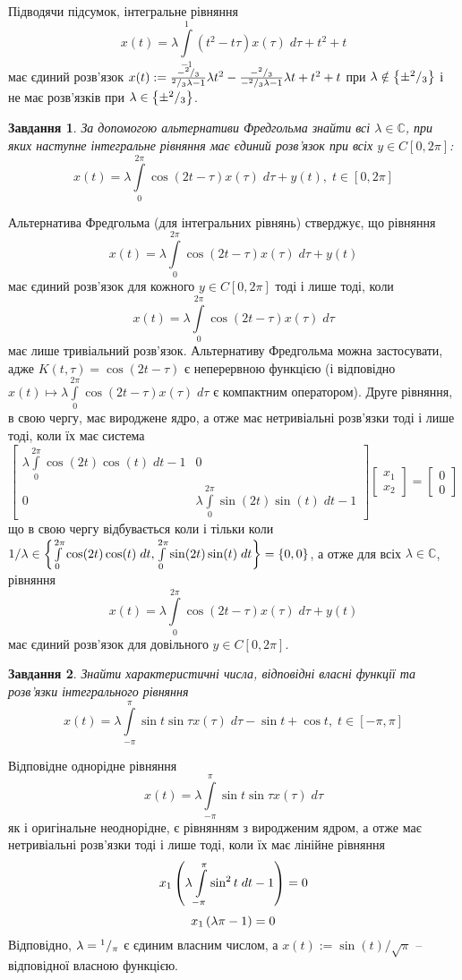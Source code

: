 \documentclass[12pt]{article} %
\newtheorem{prob}{Завдання}
\newcommand{\dt}{\;dt}
\let\oldint\int
\renewcommand{\int}{\oldint\limits}
\begin{document}
		Підводячи підсумок, інтегральне рівняння
		\[x(t)=\lambda\int_{-1}^1(t^2-t\tau)x(\tau)\;d\tau+t^2+t\]
		має єдиний розв’язок $x(t):=\frac{-{^{2}/_{3}}}{{^{2}/_{3}}\lambda-1}\lambda t^2-\frac{-{^{2}/_{3}}}{-{^{2}/_{3}}\lambda-1}
		\lambda t+t^2+t$ при $\lambda\notin\left\{\pm{^{2}/_{3}}\right\}$ і не має розв’язків при $\lambda\in\left\{\pm{^{2}/_{3}}\right\}$.
\begin{prob}За допомогою альтернативи Фредгольма знайти всі $\lambda\in\mathbb{C}$, при яких наступне інтегральне рівняння
	має єдиний розв’язок при всіх $y\in C[0,2\pi]$:
	\[x(t)=\lambda\int_0^{2\pi}\cos(2t-\tau)x(\tau)\;d\tau+y(t),\;t\in[0,2\pi]\]
\end{prob}
Альтернатива Фредгольма (для інтегральних рівнянь) стверджує, що рівняння 
\[x(t)=\lambda\int_0^{2\pi}\cos(2t-\tau)x(\tau)\;d\tau+y(t)\]
має єдиний розв’язок для кожного $y\in C[0,2\pi]$ тоді і лише тоді, коли
\[x(t)=\lambda\int_0^{2\pi}\cos(2t-\tau)x(\tau)\;d\tau\]
має лише тривіальний розв’язок. Альтернативу Фредгольма можна застосувати, адже $K(t,\tau)=\cos(2t-\tau)$ є неперервною функцією 
(і відповідно $x(t)\mapsto\lambda\int_0^{2\pi}\cos(2t-\tau)x(\tau)\;d\tau$ є компактним оператором). Друге рівняння, в свою чергу, має вироджене
ядро, а отже має нетривіальні розв’язки тоді і лише тоді, коли їх має система
\[\begin{bmatrix}\lambda\int_0^{2\pi}\cos(2t)\cos(t)\;dt-1&0\\0&\lambda\int_0^{2\pi}\sin(2t)\sin(t)\;dt-1\end{bmatrix}
	\begin{bmatrix}x_1\\x_2\end{bmatrix}=\begin{bmatrix}0\\0\end{bmatrix}\]
		що в свою чергу відбувається коли і тільки коли $1/\lambda\in\mycbra{{\int_0^{2\pi}\cos(2t)\cos(t)\;dt},
		{\int_0^{2\pi}\sin(2t)\sin(t)\;dt}}=\mycbra{0,0}$, а отже для всіх $\lambda\in\mathbb{C}$, рівняння
		\[x(t)=\lambda\int_0^{2\pi}\cos(2t-\tau)x(\tau)\;d\tau+y(t)\]
		має єдиний розв’язок для довільного $y\in C[0,2\pi]$. 
\begin{prob}
	Знайти характеристичні числа, відповідні власні функції та розв’язки інтегрального рівняння
	\[x(t)=\lambda\int_{-\pi}^{\pi}\sin t\sin\tau x(\tau)\;d\tau-\sin t+\cos t,\;t\in[-\pi,\pi]\]
\end{prob}
	Відповідне однорідне рівняння
	\[x(t)=\lambda\int_{-\pi}^{\pi}\sin t\sin\tau x(\tau)\;d\tau\]
	як і оригінальне неоднорідне, є рівнянням з виродженим ядром, а отже має нетривіальні розв’язки тоді і лише тоді, коли їх має лінійне
	рівняння
	\[x_1\mybra{\lambda\int_{-\pi}^\pi\sin^2 t\dt-1}=0\]
	\[x_1\left(\lambda\pi-1\right)=0\]
	Відповідно, $\lambda={^{1}/_{\pi}}$ є єдиним власним числом, а $x(t):=\sin(t)/\sqrt{\pi}$ -- відповідної власною функцією.
\end{document}
